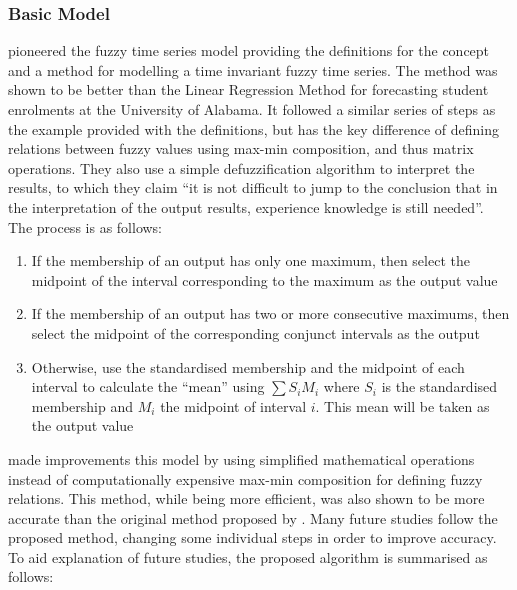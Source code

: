 \documentclass{article}
\theoremstyle{definition}
\begin{document}
\subsubsection{Basic Model}

\cite{song1993forecasting} pioneered the fuzzy time series model providing the definitions for the concept and a method for modelling a time invariant fuzzy time series. The method was shown to be better than the Linear Regression Method for forecasting student enrolments at the University of Alabama. It followed a similar series of steps as the example provided with the definitions, but has the key difference of defining relations between fuzzy values using max-min composition, and thus matrix operations. They also use a simple defuzzification algorithm to interpret the results, to which they claim ``it is not difficult to jump to the conclusion that in the interpretation of the output results, experience knowledge is still needed''. The process is as follows:

\begin{enumerate}
 \item If the membership of an output has only one maximum, then select the midpoint of the interval corresponding to the maximum as the output value
 \item If the membership of an output has two or more consecutive maximums, then select the midpoint of the corresponding conjunct intervals as the output
 \item Otherwise, use the standardised membership and the midpoint of each interval to calculate the ``mean'' using $\sum S_i M_i$ where $S_i$ is the standardised membership and $M_i$ the midpoint of interval $i$. This mean will be taken as the output value
\end{enumerate} 
 
\cite{chen1996forecasting} made improvements this model by using simplified mathematical operations instead of computationally expensive max-min composition for defining fuzzy relations. This method, while being more efficient, was also shown to be more accurate than the original method proposed by \cite{song1993forecasting}. Many future studies follow the proposed method, changing some individual steps in order to improve accuracy. To aid explanation of future studies, the proposed algorithm is summarised as follows:
\end{document}
